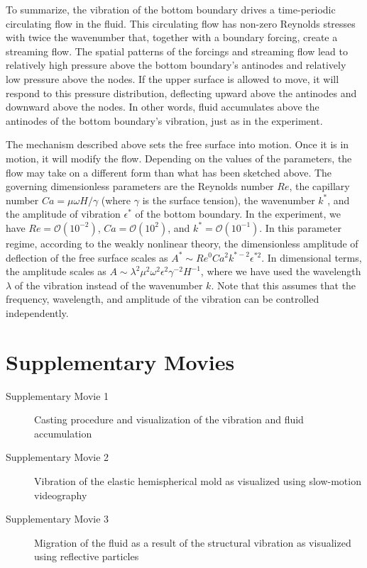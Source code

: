 \documentclass[letter,11pt]{article}
\begin{document}
To summarize, the vibration of the bottom boundary drives a time-periodic circulating flow in the fluid. This circulating flow has non-zero Reynolds stresses with twice the wavenumber that, together with a boundary forcing, create a streaming flow. The spatial patterns of the forcings and streaming flow lead to relatively high pressure above the bottom boundary's antinodes and relatively low pressure above the nodes. If the upper surface is allowed to move, it will respond to this pressure distribution, deflecting upward above the antinodes and downward above the nodes. In other words, fluid accumulates above the antinodes of the bottom boundary's vibration, just as in the experiment. 

The mechanism described above sets the free surface into motion. Once it is in motion, it will modify the flow. Depending on the values of the parameters, the flow may take on a different form than what has been sketched above. The governing dimensionless parameters are the Reynolds number $Re$, the capillary number $Ca = \mu\omega H/\gamma$ (where $\gamma$ is the surface tension), the wavenumber $k^*$, and the amplitude of vibration $\epsilon^*$ of the bottom boundary. In the experiment, we have $Re = \mathcal{O}(10^{-2})$, $Ca = \mathcal{O}(10^2)$, and $k^* = \mathcal{O}(10^{-1})$. In this parameter regime, according to the weakly nonlinear theory, the dimensionless amplitude of deflection of the free surface scales as $A^* \sim Re^0 Ca^2 k^{*-2} \epsilon^{*2}$. In dimensional terms, the amplitude scales as ${A \sim \lambda^2 \mu^2 \omega^2 \epsilon^2 \gamma^{-2} H^{-1}}$, where we have used the wavelength $\lambda$ of the vibration instead of the wavenumber $k$. Note that this assumes that the frequency, wavelength, and amplitude of the vibration can be controlled independently. 


\section{Supplementary Movies}

\begin{description}
\item[Supplementary Movie 1] Casting procedure and visualization of the vibration and fluid accumulation
\item[Supplementary Movie 2] Vibration of the elastic hemispherical mold as visualized using slow-motion videography
\item[Supplementary Movie 3] Migration of the fluid as a result of the structural vibration as visualized using reflective particles 
\end{description}
  
  
\end{document}
